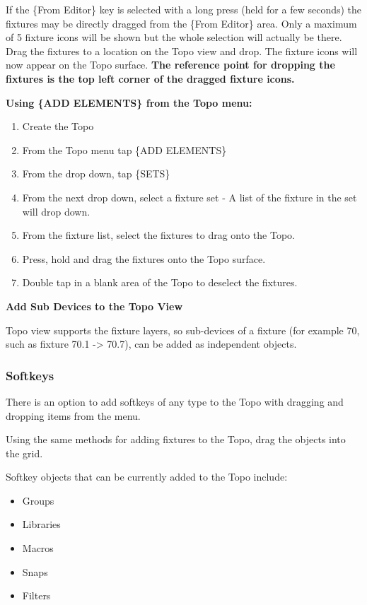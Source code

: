 \documentclass[
]{article}
\begin{document}
{If the \{From Editor\} key is selected with a long press (held for a few seconds) the fixtures may be directly dragged from the \{From Editor\} area. Only a maximum of 5 fixture icons will be shown but the whole selection will actually be there. Drag the fixtures to a location on the Topo view and drop. The fixture icons will now appear on the Topo surface. \textbf{The reference point for dropping the fixtures is the top left corner of the dragged fixture icons.}}

\textbf{Using \{ADD ELEMENTS\} from the Topo menu:}

\begin{enumerate}
\def\labelenumi{\arabic{enumi}.}
\item
  Create the Topo
\item
  From the Topo menu tap \{ADD ELEMENTS\}
\item
  From the drop down, tap \{SETS\}
\item
  From the next drop down, select a fixture set - A list of the fixture in the set will drop down.
\item
  From the fixture list, select the fixtures to drag onto the Topo.
\item
  Press, hold and drag the fixtures onto the Topo surface.
\item
  Double tap in a blank area of the Topo to deselect the fixtures.
\end{enumerate}

\textbf{Add Sub Devices to the Topo View}

Topo view supports the fixture layers, so sub-devices of a fixture (for example 70, such as fixture 70.1 -\textgreater{} 70.7), can be added as independent objects.

\hypertarget{softkeys}{%
\subsubsection{Softkeys}\label{softkeys}}

There is an option to add softkeys of any type to the Topo with dragging and dropping items from the menu.

Using the same methods for adding fixtures to the Topo, drag the objects into the grid.

Softkey objects that can be currently added to the Topo include:

\begin{itemize}
\item
  Groups
\item
  Libraries
\item
  Macros
\item
  Snaps
\item
  Filters
\end{itemize}
\end{document}
